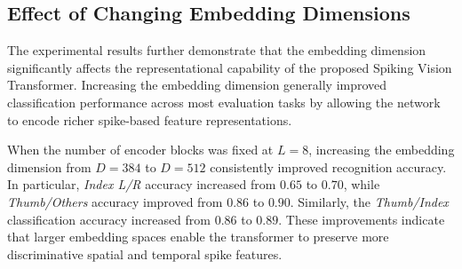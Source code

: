 \documentclass[../main.tex]{subfiles}
\begin{document}
\begin{table}[t]
\centering
\caption{Performance of Spiking Vision Transformer under different encoder depth and embedding dimension configurations (\(T=4\)).}
\label{tab:spikeformer-results}
\end{table}

\subsection{Effect of Changing Embedding Dimensions}

The experimental results further demonstrate that the embedding dimension significantly affects the representational capability of the proposed Spiking Vision Transformer. Increasing the embedding dimension generally improved classification performance across most evaluation tasks by allowing the network to encode richer spike-based feature representations.

When the number of encoder blocks was fixed at \(L=8\), increasing the embedding dimension from \(D=384\) to \(D=512\) consistently improved recognition accuracy. In particular, \textit{Index L/R} accuracy increased from \(0.65\) to \(0.70\), while \textit{Thumb/Others} accuracy improved from \(0.86\) to \(0.90\). Similarly, the \textit{Thumb/Index} classification accuracy increased from \(0.86\) to \(0.89\). These improvements indicate that larger embedding spaces enable the transformer to preserve more discriminative spatial and temporal spike features.
\end{document}
